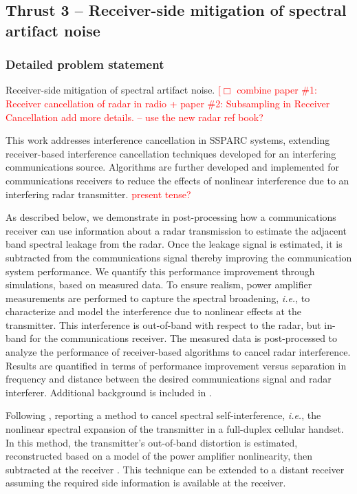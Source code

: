 \subsection{Thrust 3 -- Receiver-side mitigation of spectral artifact noise}
\subsubsection{Detailed problem statement}Receiver-side mitigation of spectral artifact noise. \textcolor{red} {[$\Box$  combine  paper \#1:  Receiver cancellation of radar in radio + paper \#2:  Subsampling in Receiver Cancellation\hspace{3mm} add more details.  -- use the new radar ref book?}\par
This work addresses interference cancellation in \mbox{SSPARC} systems, extending receiver-based interference cancellation techniques developed for an interfering communications source.  Algorithms are further developed and implemented for communications receivers to reduce the effects of nonlinear interference due to an interfering radar transmitter.  \textcolor{red}{present tense?}

As described below, we demonstrate in post-processing how a communications receiver can use information about a radar transmission to estimate the adjacent band spectral leakage from the radar.  Once the leakage signal is estimated, it is subtracted from the communications signal thereby improving the communication system performance.  We quantify this performance improvement through simulations, based on measured data.  To ensure realism, power amplifier measurements are performed to capture the spectral broadening, \emph{i.e.}, to characterize and model the interference due to nonlinear effects at the transmitter.  This interference is out-of-band with respect to the radar, but in-band for the communications receiver.  The measured data is post-processed to analyze the performance of receiver-based algorithms to cancel radar interference.  Results are quantified in terms of performance improvement versus separation in frequency and distance between the desired communications signal and radar interferer.  Additional background is included in \cite{tokuda2014canc}.\par
Following \cite{Omer}, reporting a method to cancel spectral self-interference, \textit{i.e.}, the nonlinear spectral expansion of the transmitter in a full-duplex cellular handset.  In this method, the transmitter's out-of-band distortion is estimated, reconstructed based on a model of the power amplifier nonlinearity, then subtracted at the receiver \cite{Omer}.  This technique can be extended to a distant receiver assuming the required side information is available at the receiver.  

